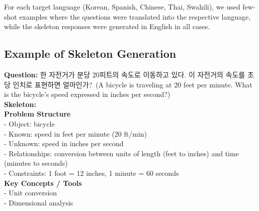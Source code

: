For each target language (Korean, Spanish, Chinese, Thai, Swahili), we used few-shot examples where the questions were translated into the respective language, while the skeleton responses were generated in English in all cases.

\subsection{Example of Skeleton Generation}


\begin{tcolorbox}[
  colback=blue!3,
  colframe=gray!60!black,
  boxrule=0.5pt,
  arc=4pt,
  left=6pt,
  right=6pt,
  top=4pt,
  bottom=4pt,
  title=Example~(1): Skeleton Generation
]
\small
\textbf{Question:} 한 자전거가 분당 20피트의 속도로 이동하고 있다. 이 자전거의 속도를 초당 인치로 표현하면 얼마인가?~(A bicycle is traveling at 20 feet per minute. What is the bicycle's speed expressed in inches per second?)\\[0.5em]

\textbf{Skeleton:}\\
\textbf{Problem Structure}\\
- Object: bicycle\\
- Known: speed in feet per minute (20 ft/min)\\
- Unknown: speed in inches per second\\
- Relationships: conversion between units of length (feet to inches) and time (minutes to seconds)\\
- Constraints: 1 foot = 12 inches, 1 minute = 60 seconds\\[0.3em]
\textbf{Key Concepts / Tools}\\
- Unit conversion\\
- Dimensional analysis
\end{tcolorbox}



